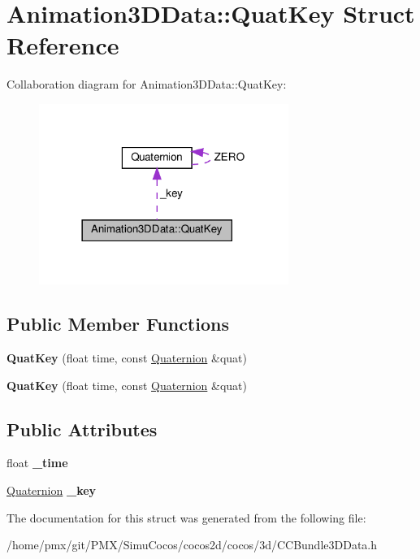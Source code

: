 \hypertarget{structAnimation3DData_1_1QuatKey}{}\section{Animation3\+D\+Data\+:\+:Quat\+Key Struct Reference}
\label{structAnimation3DData_1_1QuatKey}


Collaboration diagram for Animation3\+D\+Data\+:\+:Quat\+Key\+:
\nopagebreak
\begin{figure}[H]
\begin{center}
\leavevmode
\includegraphics[width=230pt]{structAnimation3DData_1_1QuatKey__coll__graph}
\end{center}
\end{figure}
\subsection*{Public Member Functions}
\begin{DoxyCompactItemize}
\item 
\mbox{\label{structAnimation3DData_1_1QuatKey_a3d84b5b6912f1efdae5c86410a479abe}} 
{\bfseries Quat\+Key} (float time, const \hyperlink{classQuaternion}{Quaternion} \&quat)
\item 
\mbox{\label{structAnimation3DData_1_1QuatKey_a3d84b5b6912f1efdae5c86410a479abe}} 
{\bfseries Quat\+Key} (float time, const \hyperlink{classQuaternion}{Quaternion} \&quat)
\end{DoxyCompactItemize}
\subsection*{Public Attributes}
\begin{DoxyCompactItemize}
\item 
\mbox{\label{structAnimation3DData_1_1QuatKey_aaaf4d3154eaea6f054a0f8698b5bd2d8}} 
float {\bfseries \+\_\+time}
\item 
\mbox{\label{structAnimation3DData_1_1QuatKey_ae2397085259eb42efb4cd2a2e4cbe5ba}} 
\hyperlink{classQuaternion}{Quaternion} {\bfseries \+\_\+key}
\end{DoxyCompactItemize}


The documentation for this struct was generated from the following file\+:\begin{DoxyCompactItemize}
\item 
/home/pmx/git/\+P\+M\+X/\+Simu\+Cocos/cocos2d/cocos/3d/C\+C\+Bundle3\+D\+Data.\+h\end{DoxyCompactItemize}
